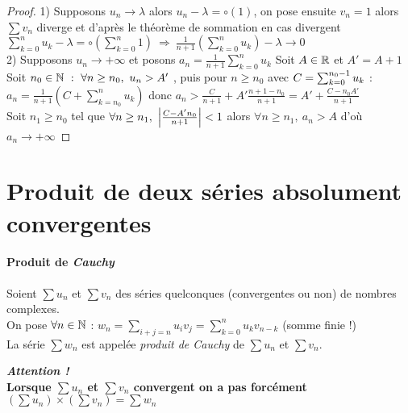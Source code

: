 			
		\begin{proof}
			{\small 1)} Supposons $u_n \to \lambda$ alors $u_n - \lambda = \circ (1)$, on pose ensuite $v_n = 1$ alors $\sum v_n$ diverge 
			et d'après le théorème de sommation en cas divergent \\ $\sum_{k=0}^{n} u_k - \lambda = \circ ( \sum_{k=0}^{n} 1 ) ~
			\Rightarrow ~\frac{1}{n+1} ( \sum_{k=0}^{n} u_k ) - \lambda \to 0$ \\
			{\small 2)} Supposons $u_n \to +\infty$ et posons $a_n = \frac{1}{n+1} \sum_{k=0}^{n} u_k$
			Soit $A\in{\mathbb{R}}$ et $A'=A+1$ \\ Soit $n_0 \in{\mathbb{N}} ~:~\forall n\geq n_0 ,~u_n >A'$ , puis pour $n\geq n_0$ avec $C = \sum_{k= 0 }^{n_0-1} u_k$ :\\
			$a_n = \frac{1}{n+1} ( C + \sum_{k=n_0}^{n} u_k)$ 
			donc $a_n > \frac{C}{n+1} + A'\frac{n+1-n_0}{n+1} = A' + \frac{C-n_0A'}{n+1}$ \\ 
			Soit $n_1\geq n_0$ tel que $\forall n\geq n_1 ,~\left\vert \frac{C-A'n_0}{n+1} \right\vert <1$ alors $\forall n\geq n_1 ,~a_n > A$ d'où $a_n \to +\infty$
		\end{proof} \medskip
		

\section{Produit de deux séries absolument convergentes}

		\vspace{-15pt}
		\traitd
		\paragraph{Produit de \emph{Cauchy}}
			Soient $\sum u_n$ et $\sum v_n$ des séries quelconques (convergentes ou non) de nombres complexes.\\
			On pose $\forall n \in {\mathbb{N}}$ : $w_n = \sum\limits_{i+j=n} u_i v_j = \sum_{k=0}^{n} u_k v_{n-k}$ (somme finie !) \\
			La série $\sum w_n$ est appelée \emph{produit de \emph{Cauchy}} de $\sum u_n$ et $\sum v_n$.
		\trait
				
		\textbf{\emph{Attention !} \\Lorsque $\sum u_n$ et $\sum v_n$ convergent on a pas forcément 
			$\left(\sum u_n \right) \times \left(\sum v_n \right) = \sum w_n$} \medskip \\
		
